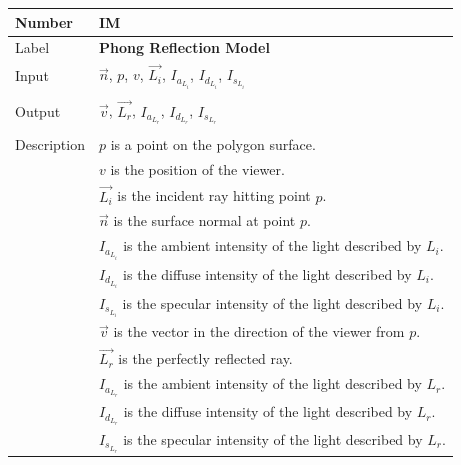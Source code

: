 \documentclass[12pt]{article}
\newcommand{\colAwidth}{0.13\textwidth}
\newcommand{\colBwidth}{0.82\textwidth}
\newcounter{instnum} %
\begin{document}
\noindent
\begin{minipage}{\textwidth}
	\renewcommand*{\arraystretch}{1.5}
	\begin{tabular}{| p{\colAwidth} | p{\colBwidth}|}
		\hline
		\rowcolor[gray]{0.9}
		Number& IM{instnum}\theinstnum \label{IM_Phong}\\
		\hline
		Label& \bf Phong Reflection Model\\
		\hline
		Input& $\vec{n}$, $p$, $v$, $\vec{L_{i}}$, $I_{a_{L_{i}}}$, 
		$I_{d_{L_{i}}}$, $I_{s_{L_{i}}}$\\
		& \\
		\hline
		Output& $\vec{v}$, $\vec{L_{r}}$, $I_{a_{L_{r}}}$, $I_{d_{L_{r}}}$, 
		$I_{s_{L_{r}}}$ \\
		& \\
		\hline
		Description& $p$ is a point on the polygon surface.\\
		& $v$ is the position of the viewer.\\
		& $\vec{L_{i}}$ is the incident ray hitting point $p$.\\
		& $\vec{n}$ is the surface normal at point $p$.\\
		& $I_{a_{L_{i}}}$ is the ambient intensity of the light described by 
		$L_{i}$.\\
		& $I_{d_{L_{i}}}$ is the diffuse intensity of the light described by 
		$L_{i}$. \\
		& $I_{s_{L_{i}}}$ is the specular intensity of the light described by 
		$L_{i}$. \\
		& $\vec{v}$ is the vector in the direction of the viewer from $p$.\\
		& $\vec{L_{r}}$ is the perfectly reflected ray.\\
		& $I_{a_{L_{r}}}$ is the ambient intensity of the light described by 
		$L_{r}$.\\
		& $I_{d_{L_{r}}}$ is the diffuse intensity of the light described by 
		$L_{r}$. \\
		& $I_{s_{L_{r}}}$ is the specular intensity of the light described by 
		$L_{r}$. \\
				

\end{tabular}
\end{minipage}
\end{document}
